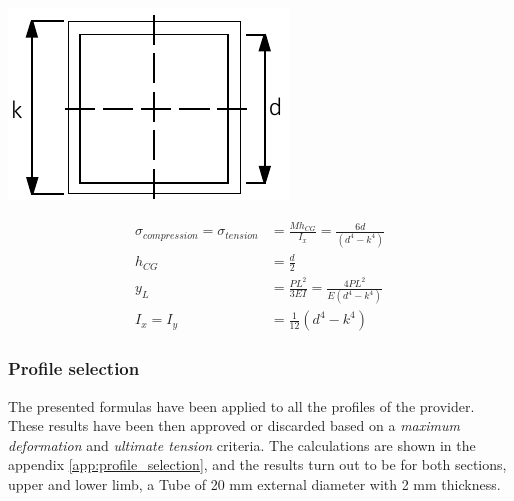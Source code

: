   \noindent\begin{minipage}{0.2\textwidth}%
      \includegraphics[width=\linewidth]{figures/profile_squared.pdf}
  \end{minipage}%
  \hfill%
  \begin{minipage}{0.8\textwidth}
    \begin{equation}
    \begin{aligned}
      \sigma _{compression} = \sigma _{tension} &= \frac{M h_{CG}}{I_x} = \frac{6 d}{(d^4 - k^4)}\\
      h_{CG} &= \frac{d}{2} \\
      y_L &= \frac{P L^2}{3EI} = \frac{4 P L^2}{E (d^4 - k^4)}\\
      I_x = I_y &= \frac{1}{12} (d^4 - k^4)
      \end{aligned}
    \end{equation}
  \end{minipage}

\subsubsection{Profile selection} %
\label{ssub:profile_selection}
The presented formulas have been applied to all the profiles of the provider.
These results have been then approved or discarded based on a \textit{maximum deformation} and \textit{ultimate tension} criteria.
The calculations are shown in the appendix \ref{app:profile_selection}, and the results turn out to be for both sections, upper and lower limb, a Tube of 20 mm external diameter with 2 mm thickness.




